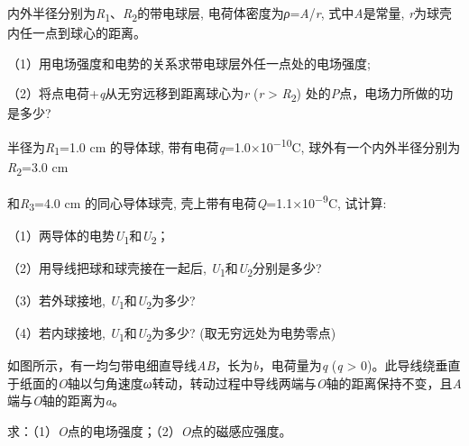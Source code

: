 \documentclass[fontset=exam]{exam-zh}
\begin{document}
内外半径分别为\emph{R}\textsubscript{1}、\emph{R}\textsubscript{2}的带电球层, 电荷体密度为\emph{ρ}=\emph{A}/\emph{r}, 式中\emph{A}是常量, \emph{r}为球壳内任一点到球心的距离。

（1）用电场强度和电势的关系求带电球层外任一点处的电场强度;

（2）将点电荷+\emph{q}从无穷远移到距离球心为\emph{r} (\emph{r} \textgreater{} \emph{R}\textsubscript{2}) 处的\emph{P}点，电场力所做的功是多少?


\par{}\smallskip

半径为\emph{R}\textsubscript{1}=1.0 cm 的导体球, 带有电荷\emph{q}=1.0×10\textsuperscript{−10}C, 球外有一个内外半径分别为\emph{R}\textsubscript{2}=3.0 cm

和\emph{R}\textsubscript{3}=4.0 cm 的同心导体球壳, 壳上带有电荷\emph{Q}=1.1×10\textsuperscript{−9}C, 试计算:

（1）两导体的电势\emph{U}\textsubscript{1}和\emph{U}\textsubscript{2}；

（2）用导线把球和球壳接在一起后, \emph{U}\textsubscript{1}和\emph{U}\textsubscript{2}分别是多少?

（3）若外球接地, \emph{U}\textsubscript{1}和\emph{U}\textsubscript{2}为多少?

（4）若内球接地, \emph{U}\textsubscript{1}和\emph{U}\textsubscript{2}为多少? (取无穷远处为电势零点)


\par{}\smallskip

如图所示，有一均匀带电细直导线\emph{AB}，长为\emph{b}，电荷量为\emph{q} (\emph{q} \textgreater{} 0)。此导线绕垂直于纸面的\emph{O}轴以匀角速度\emph{ω}转动，转动过程中导线两端与\emph{O}轴的距离保持不变，且\emph{A}端与\emph{O}轴的距离为\emph{a}。

求：（1）\emph{O}点的电场强度；（2）\emph{O}点的磁感应强度。

\end{document}

